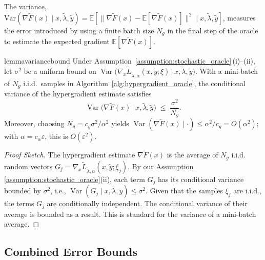 \documentclass[letterpaper]{article} %
\newcommand{\1}{\mathbf{1}}
\begin{document}
The variance, $\text{Var}(\nabla\tilde{F}(x)\mid x, \tilde{\lambda}, \tilde{y}) = \mathbb{E}[\|\nabla\tilde{F}(x) - \mathbb{E}[\nabla\tilde{F}(x)]\|^2\mid x, \tilde{\lambda}, \tilde{y}]$, measures the error introduced by using a finite batch size $N_g$ in the final step of the oracle to estimate the expected gradient $\mathbb{E}[\nabla\tilde{F}(x)]$.

\begin{restatable}{lemma}{variancebound}
\label{lemma:variance-bound}
Under Assumption~\ref{assumption:stochastic_oracle}\,(i)--(ii),
let $\sigma^2$ be a uniform bound on 
\(
\operatorname{Var}\!\bigl(\nabla_x \tilde L_{\tilde\lambda,\alpha}(x,\tilde y;\xi)\,\big|\,x,\tilde\lambda,\tilde y\bigr).
\)
With a mini‑batch of $N_g$ i.i.d.\ samples in Algorithm~\ref{alg:hypergradient_oracle}, the conditional variance of the hypergradient estimate satisfies
\[
\operatorname{Var}\!\bigl(\nabla\tilde F(x)\,\big|\,x,\tilde\lambda,\tilde y\bigr)
\;\le\;
\frac{\sigma^{2}}{N_g}.
\]
Moreover, choosing $N_g=c_g\sigma^{2}/\alpha^{2}$ yields $\operatorname{Var}(\nabla\tilde F(x)\mid\cdot)\le \alpha^{2}/c_g = O(\alpha^{2})$; with $\alpha=c_{\alpha}\varepsilon$, this is $O(\varepsilon^{2})$.
\end{restatable}
\begin{proof}[Proof Sketch]
The hypergradient estimate $\nabla\tilde{F}(x)$ is the average of $N_g$ i.i.d. random vectors $G_j = \nabla_x \tilde L_{\tilde\lambda,\alpha}(x, \tilde y;\xi_j)$. By our Assumption \ref{assumption:stochastic_oracle}(ii), each term $G_j$ has its conditional variance bounded by $\sigma^2$, i.e., $\operatorname{Var}(G_j \mid x, \tilde{\lambda}, \tilde{y}) \leq \sigma^2$. Given that the samples $\xi_j$ are i.i.d., the terms $G_j$ are conditionally independent. The conditional variance of their average is bounded as a result. This is standard for the variance of a mini-batch average.
\end{proof}

\subsection{Combined Error Bounds}
\end{document}
